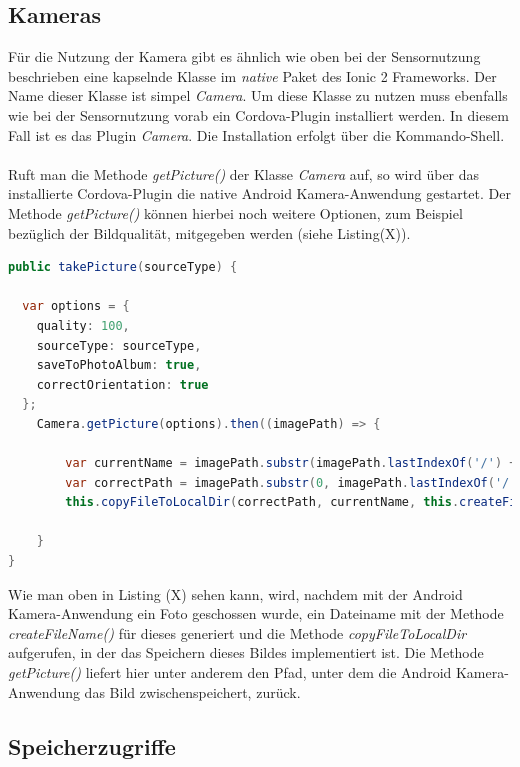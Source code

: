 \subsection*{Kameras}

Für die Nutzung der Kamera gibt es ähnlich wie oben bei der Sensornutzung beschrieben eine kapselnde Klasse im \textit{native} Paket des Ionic 2 Frameworks. Der Name dieser Klasse ist simpel \textit{Camera}. Um diese Klasse zu nutzen muss ebenfalls wie bei der Sensornutzung vorab ein Cordova-Plugin installiert werden. In diesem Fall ist es das Plugin \textit{Camera}. Die Installation erfolgt über die Kommando-Shell. 
\\
\\
Ruft man die Methode \textit{getPicture()} der Klasse \textit{Camera} auf, so wird über das installierte Cordova-Plugin die native Android Kamera-Anwendung gestartet. Der Methode \textit{getPicture()} können hierbei noch weitere Optionen, zum Beispiel bezüglich der Bildqualität, mitgegeben werden (siehe Listing(X)). 

\begin{lstlisting}[caption=Aufruf der Android Kamera-Anwendung über die Methode \textit{getPicture()}, label=lst:CameraIonic, language=Java]
public takePicture(sourceType) {
  
  var options = {
    quality: 100,
    sourceType: sourceType,
    saveToPhotoAlbum: true,
    correctOrientation: true
  };
	Camera.getPicture(options).then((imagePath) => {
      
        var currentName = imagePath.substr(imagePath.lastIndexOf('/') + 1);
        var correctPath = imagePath.substr(0, imagePath.lastIndexOf('/') + 1);
        this.copyFileToLocalDir(correctPath, currentName, this.createFileName());
      
    }
}
\end{lstlisting}

Wie man oben in Listing (X) sehen kann, wird, nachdem mit der Android Kamera-Anwendung ein Foto geschossen wurde, ein Dateiname mit der Methode \textit{createFileName()} für dieses generiert und die Methode \textit{copyFileToLocalDir} aufgerufen, in der das Speichern dieses Bildes implementiert ist. Die Methode \textit{getPicture()} liefert hier unter anderem den Pfad, unter dem die Android Kamera-Anwendung das Bild zwischenspeichert, zurück.

\subsection*{Speicherzugriffe}

